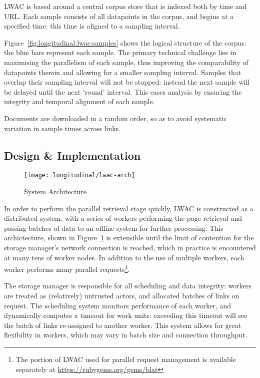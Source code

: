LWAC is based around a central corpus store that is indexed both by time and URL.  Each sample consists of all datapoints in the corpus, and begins at a specified time: this time is aligned to a sampling interval.

Figure~\ref{fig:longitudinal:lwac:samples} shows the logical structure of the corpus: the blue bars represent each sample.  The primary technical challenge lies in maximising the parallelism of each sample, thus improving the comparability of datapoints therein and allowing for a smaller sampling interval.  Samples that overlap their sampling interval will not be stopped: instead the next sample will be delayed until the next `round' interval.  This eases analysis by ensuring the integrity and temporal alignment of each sample.

Documents are downloaded in a random order, so as to avoid systematic variation in sample times across links.



\subsection{Design \& Implementation}


\begin{figure}[Ht]
    \centering
    \texttt{[image: longitudinal/lwac-arch]}
    \caption{System Architecture}
    \label{fig:longitudinal:lwac:arch}
\end{figure}


In order to perform the parallel retrieval stage quickly, LWAC is constructed as a distributed system, with a series of workers performing the page retrieval and passing batches of data to an offline system for further processing.  This archictecture, shown in Figure~\ref{fig:longitudinal:lwac:arch} is extensible until the limit of contention for the storage manager's network connection is reached, which in practice is encountered at many tens of worker nodes.  In addition to the use of multiple workers, each worker performs many parallel requests\footnote{The portion of LWAC used for parallel request management is available separately at \url{https://rubygems.org/gems/blat}}.

The storage manager is responsible for all scheduling and data integrity: workers are treated as (relatively) untrusted actors, and allocated batches of links on request.  The scheduling system monitors performance of each worker, and dynamically computes a timeout for work units: exceeding this timeout will see the batch of links re-assigned to another worker.  This system allows for great flexibility in workers, which may vary in batch size and connection throughput.

